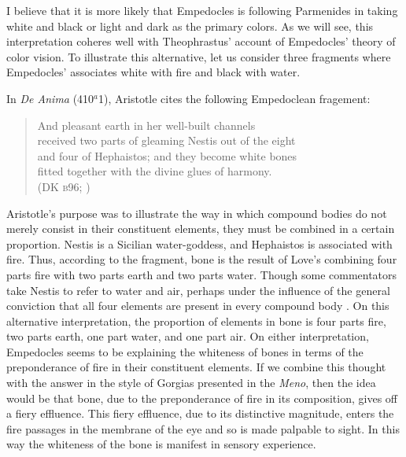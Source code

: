 I believe that it is more likely that Empedocles is following Parmenides in taking white and black or light and dark as the primary colors. As we will see, this interpretation coheres well with Theophrastus' account of Empedocles' theory of color vision. To illustrate this alternative, let us consider three fragments where Empedocles' associates white with fire and black with water.


In \emph{De Anima} (410\( ^{a} \)1), Aristotle cites the following Empedoclean fragement:
\begin{verse}
    And pleasant earth in her well-built channels\\
    received two parts of gleaming Nestis out of the eight\\
    and four of Hephaistos; and they become white bones\\
    fitted together with the divine glues of harmony.\\
    (DK \textsc{b}96; \citealt[62 245]{Inwood:2001ve})
\end{verse}
Aristotle's purpose was to illustrate the way in which compound bodies do not merely consist in their constituent elements, they must be combined in a certain proportion. Nestis is a Sicilian water-goddess, and Hephaistos is associated with fire. Thus, according to the fragment, bone is the result of Love's combining four parts fire with two parts earth and two parts water. Though some commentators take Nestis to refer to water and air, perhaps under the influence of the general conviction that all four elements are present in every compound body \citep[209 n2]{Wright:1981zr}. On this alternative interpretation, the proportion of elements in bone is four parts fire, two parts earth, one part water, and one part air. On either interpretation, Empedocles seems to be explaining the whiteness of bones in terms of the preponderance of fire in their constituent elements. If we combine this thought with the answer in the style of Gorgias presented in the \emph{Meno}, then the idea would be that bone, due to the preponderance of fire in its composition, gives off a fiery effluence. This fiery effluence, due to its distinctive magnitude, enters the fire passages in the membrane of the eye and so is made palpable to sight. In this way the whiteness of the bone is manifest in sensory experience.

